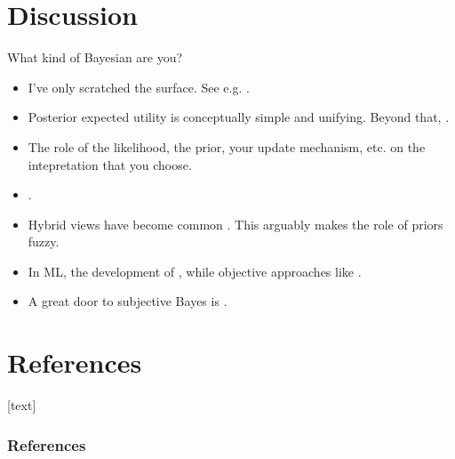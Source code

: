 \documentclass[10pt]{beamer}
\begin{document}
\section{Discussion}
\begin{frame}{What kind of Bayesian are you?}
\begin{itemize}
\item I've only scratched the surface. See e.g. \citep{May18}.
\vfill
\item Posterior expected utility is conceptually simple and unifying. Beyond that, .
\vfill
\item The role of the likelihood, the prior, your update mechanism, etc.  on the intepretation that you choose.
\vfill
\item[\frownie] .
\vfill
\item Hybrid views have become common \citep{Rob07,GCSDVR13}. This arguably makes the role of priors fuzzy.
\vfill
\item In ML, the development of , while objective approaches like .
\vfill
\item A great door to subjective Bayes is \citep{PaIn09}.
\end{itemize}
\end{frame}
  


\section*{References}
[text]%
\begin{frame}[allowframebreaks]
\frametitle{References}
\small
\printbibliography
\normalsize
\end{frame}
\end{document}
